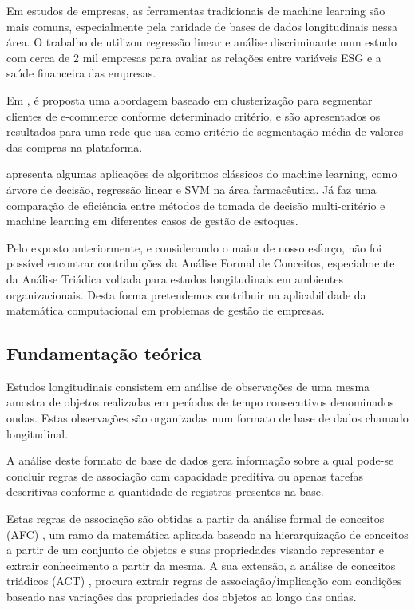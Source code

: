 \documentclass[12pt]{article}
\begin{document}
Em estudos de empresas, as ferramentas tradicionais de machine learning são mais comuns, especialmente pela raridade de bases de dados longitudinais nessa área. O trabalho de \cite{lima:24} utilizou regressão linear e análise discriminante num estudo com cerca de 2 mil empresas para avaliar as relações entre variáveis ESG e a saúde financeira das empresas.

Em \cite{falqueto:22}, é proposta uma abordagem baseado em clusterização para segmentar clientes de e-commerce conforme determinado critério, e são apresentados os resultados para uma rede que usa como critério de segmentação média de valores das compras na plataforma.

\cite{campos:21} apresenta algumas aplicações de algoritmos clássicos do machine learning, como árvore de decisão, regressão linear e SVM na área farmacêutica. Já \cite{vidal:20} faz uma comparação de eficiência entre métodos de tomada de decisão multi-critério e machine learning em diferentes casos de gestão de estoques.

Pelo exposto anteriormente, e considerando o maior de nosso esforço, não foi possível encontrar contribuições da Análise Formal de Conceitos, especialmente da Análise Triádica voltada para estudos longitudinais em ambientes organizacionais. Desta forma pretendemos contribuir na aplicabilidade da matemática computacional em problemas de gestão de empresas.

\subsection{Fundamentação teórica}

Estudos longitudinais consistem em análise de observações de uma mesma amostra de objetos realizadas em períodos de tempo consecutivos denominados ondas. Estas observações são organizadas num formato de base de dados chamado longitudinal.

A análise deste formato de base de dados gera informação sobre a qual pode-se concluir regras de associação com capacidade preditiva ou apenas tarefas descritivas conforme a quantidade de registros presentes na base.

Estas regras de associação são obtidas a partir da análise formal de conceitos (AFC) \cite{wille:95}, um ramo da matemática aplicada baseado na hierarquização de conceitos a partir de um conjunto de objetos e suas propriedades visando representar e extrair conhecimento a partir da mesma. A sua extensão, a análise de conceitos triádicos (ACT) \cite{lehmann:95}, procura extrair regras de associação/implicação com condições baseado nas variações das propriedades dos objetos ao longo das ondas.
\end{document}
